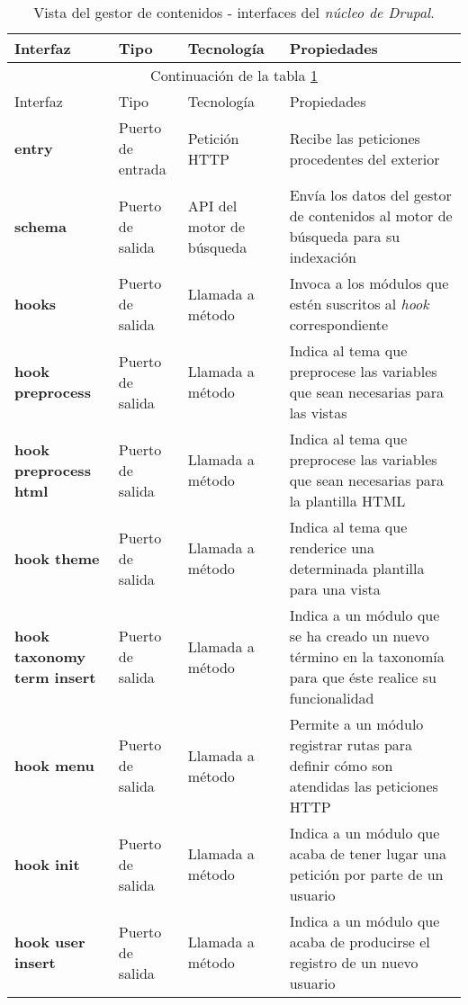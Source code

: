 \begin{longtable}[c]{|p{25mm}|p{20mm}|p{30mm}|p{60mm}|}
	\caption{Vista del gestor de contenidos - interfaces del \textit{núcleo de Drupal}.\label{interfaces_cms_drupalcore}}\\
		\hline
			Interfaz & Tipo & Tecnología & Propiedades\\
		\hline
		\hline
	\endfirsthead
		\hline
		\multicolumn{4}{|c|}{Continuación de la tabla \ref{interfaces_cms_drupalcore}}\\
		\hline
			Interfaz & Tipo & Tecnología & Propiedades\\
		\hline
		\hline
	\endhead
	\hline
	\endfoot
		\textbf{entry} & Puerto de entrada & Petición HTTP & Recibe las peticiones procedentes del exterior \\
		\hline
		
		\textbf{schema} & Puerto de salida & API del motor de búsqueda & Envía los datos del gestor de contenidos al motor de búsqueda para su indexación \\
		\hline
		
		\textbf{hooks} & Puerto de salida & Llamada a método & Invoca a los módulos que estén suscritos al \textit{hook} correspondiente \\
		\hline
		
		\textbf{hook preprocess} & Puerto de salida & Llamada a método & Indica al tema que preprocese las variables que sean necesarias para las vistas \\
		\hline
		
		\textbf{hook preprocess html} & Puerto de salida & Llamada a método & Indica al tema que preprocese las variables que sean necesarias para la plantilla HTML \\
		\hline
		
		\textbf{hook theme} & Puerto de salida & Llamada a método & Indica al tema que renderice una determinada plantilla para una vista \\
		\hline
		
		\textbf{hook taxonomy term insert} & Puerto de salida & Llamada a método & Indica a un módulo que se ha creado un nuevo término en la taxonomía para que éste realice su funcionalidad \\
		\hline
		
		\textbf{hook menu} & Puerto de salida & Llamada a método & Permite a un módulo registrar rutas para definir cómo son atendidas las peticiones HTTP \\
		\hline
		
		\textbf{hook init} & Puerto de salida & Llamada a método & Indica a un módulo que acaba de tener lugar una petición por parte de un usuario \\
		\hline
		
		\textbf{hook user insert} & Puerto de salida & Llamada a método & Indica a un módulo que acaba de producirse el registro de un nuevo usuario \\
	\hline
	\hline
\end{longtable}


